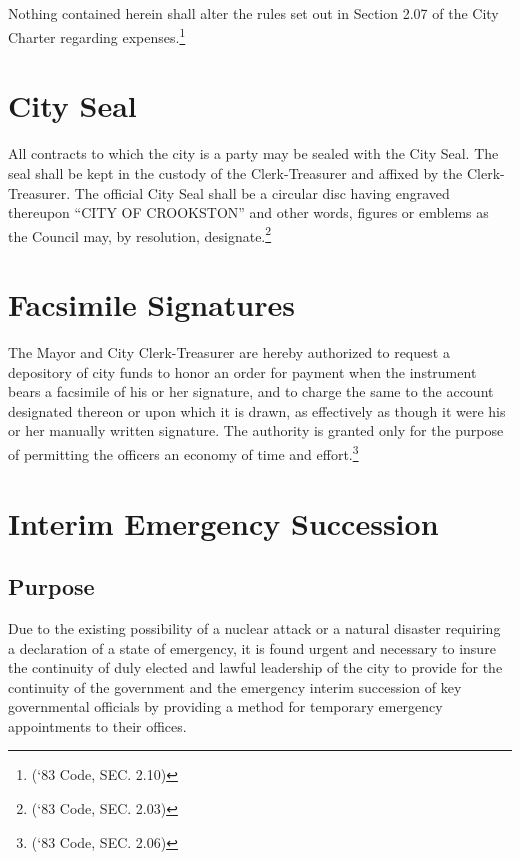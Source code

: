 \subsection{}
Nothing contained herein shall alter the rules set out in Section 2.07 of the City Charter regarding expenses.\footnote{(‘83 Code, SEC. 2.10)}



\section{City Seal}
All contracts to which the city is a party may be sealed with the City Seal.  The seal shall be kept in the custody of the Clerk-Treasurer and affixed by the Clerk-Treasurer.  The official City Seal shall be a circular disc having engraved thereupon “CITY OF CROOKSTON” and other words, figures or emblems as the Council may, by resolution, designate.\footnote{(‘83 Code, SEC. 2.03)}



\section{Facsimile Signatures}
The Mayor and City Clerk-Treasurer are hereby authorized to request a depository of city funds to honor an order for payment when the instrument bears a facsimile of his or her signature, and to charge the same to the account designated thereon or upon which it is drawn, as effectively as though it were his or her manually written signature. The authority is granted only for the purpose of permitting the officers an economy of time and effort.\footnote{(‘83 Code, SEC. 2.06)}



\section{Interim Emergency Succession}
\subsection{Purpose}
Due to the existing possibility of a nuclear attack or a natural disaster requiring a declaration of a state of emergency, it is found urgent and necessary to insure the continuity of duly elected and lawful leadership of the city to provide for the continuity of the government and the emergency interim succession of key governmental officials by providing a method for temporary emergency appointments to their offices.
